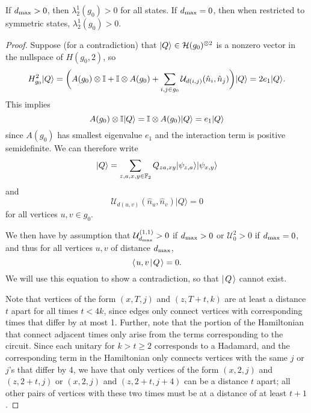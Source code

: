 \documentclass[../thesis-main/thesis-main]{subfiles}
\begin{document}
\begin{lemma}
\label{lem:2particle}If $d_{\text{max}} > 0$, then $\lambda_{2}^{1}(g_{0})>0$ for all states.  If $d_{\text{max}} = 0$, then when restricted to symmetric states, $\lambda_2^{1}(g_0) >0$.
\end{lemma}

\begin{proof}
Suppose (for a contradiction) that $|Q\rangle\in \mathcal{H}(g_0)^{\otimes 2}$ is a nonzero vector in the nullspace of $H(g_{0},2)$, so 
\begin{equation}
  H_{g_{0}}^{2}|Q\rangle
    =\bigg(A(g_{0})\otimes\mathbb{I}+\mathbb{I}\otimes A(g_{0})+\sum_{i,j \in g_{0}}\mathcal{U}_{d(i,j)}(\hat{n}_i,\hat{n}_j)\bigg)|Q\rangle=2e_{1}|Q\rangle.
\end{equation}
This implies 
\begin{equation}
  A(g_{0})\otimes\mathbb{I}|Q\rangle=\mathbb{I}\otimes A(g_{0})|Q\rangle=e_{1}|Q\rangle
\end{equation}
since $A(g_0)$ has smallest eigenvalue $e_1$ and the interaction term is positive semidefinite. We can therefore write 
\begin{equation}
  |Q\rangle=\sum_{z,a,x,y\in \mathbb{F}_2}Q_{za,xy}|\psi_{z,a}\rangle|\psi_{x,y}\rangle
\end{equation}
and 
\begin{equation}
  \mathcal{U}_{d(u,v)}(\hat{n}_u,\hat{n}_v)|Q\rangle=0
\end{equation}
for all vertices $u,v\in g_{0}.$ 


We then have by assumption that  $\mathcal{U}^{(1,1)}_{d_{\text{max}}} >  0$ if $d_{\text{max}} > 0$ or $\mathcal{U}^{2}_{0} > 0$ if $d_{\text{max}} = 0$,  and thus for all vertices $u,v$ of distance $d_{\text{max}}$, 
\begin{equation}
  \langle\mspace{2mu} u,v \mspace{2mu} | \mspace{2mu} Q\mspace{2mu} \rangle = 0\label{eq:dmin_annihilate}.
\end{equation}
We will use this equation to show a contradiction, so that $|\mspace{2mu} Q \mspace{2mu} \rangle$ cannot exist.

Note that vertices of the form $(x,T,j)$ and $(z,T+t,k)$ are at least a distance $t$ apart for all times $t < 4 k$, since edges only connect vertices with corresponding times that differ by at most 1.  Further, note that the portion of the Hamiltonian that connect adjacent times only arise from the terms corresponding to the circuit.  Since each unitary for $k > t\geq 2$ corresponds to a Hadamard, and the corresponding term in the Hamiltonian only connects vertices with the same $j$ or $j$'s that differ by 4, we have that only vertices of the form $(x,2,j)$ and $(z,2+t,j)$ or $(x,2,j)$ and $(z,2+t,j+4)$ can be a distance $t$ apart; all other pairs of vertices with these two times must be at a distance of at least $t+1$.


\end{proof}
\end{document}

